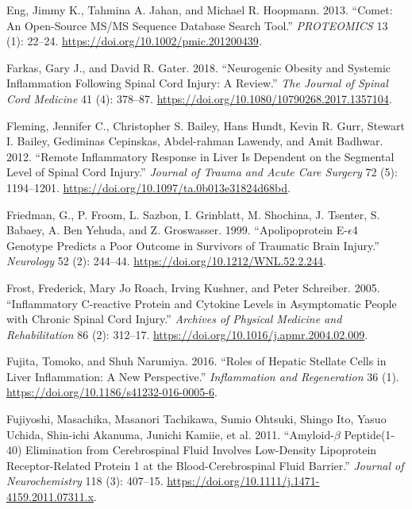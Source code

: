 \documentclass[9pt,lineno]{elife}
\newlength{\cslhangindent}
\newlength{\cslentryspacingunit} %
\newenvironment{CSLReferences}[2] %
 {%
  \setlength{\parindent}{0pt}
  \ifodd #1
  \let\oldpar\par
  \def\par{\hangindent=\cslhangindent\oldpar}
  \fi
  \setlength{\parskip}{#2\cslentryspacingunit}
 }%
 {}
\begin{document}
\begin{landscape}
\begin{landscape}
\begin{landscape}
\begin{landscape}
\begin{CSLReferences}{1}{0}
\leavevmode{}%
Eng, Jimmy K., Tahmina A. Jahan, and Michael R. Hoopmann. 2013. {``Comet: {An} Open-Source {MS}/{MS} Sequence Database Search Tool.''} \emph{PROTEOMICS} 13 (1): 22--24. \url{https://doi.org/10.1002/pmic.201200439}.

\leavevmode{}%
Farkas, Gary J., and David R. Gater. 2018. {``Neurogenic Obesity and Systemic Inflammation Following Spinal Cord Injury: {A} Review.''} \emph{The Journal of Spinal Cord Medicine} 41 (4): 378--87. \url{https://doi.org/10.1080/10790268.2017.1357104}.

\leavevmode{}%
Fleming, Jennifer C., Christopher S. Bailey, Hans Hundt, Kevin R. Gurr, Stewart I. Bailey, Gediminas Cepinskas, Abdel-rahman Lawendy, and Amit Badhwar. 2012. {``Remote Inflammatory Response in Liver Is Dependent on the Segmental Level of Spinal Cord Injury.''} \emph{Journal of Trauma and Acute Care Surgery} 72 (5): 1194--1201. \url{https://doi.org/10.1097/ta.0b013e31824d68bd}.

\leavevmode{}%
Friedman, G., P. Froom, L. Sazbon, I. Grinblatt, M. Shochina, J. Tsenter, S. Babaey, A. Ben Yehuda, and Z. Groswasser. 1999. {``Apolipoprotein {E-\(\epsilon\)4} Genotype Predicts a Poor Outcome in Survivors of Traumatic Brain Injury.''} \emph{Neurology} 52 (2): 244--44. \url{https://doi.org/10.1212/WNL.52.2.244}.

\leavevmode{}%
Frost, Frederick, Mary Jo Roach, Irving Kushner, and Peter Schreiber. 2005. {``Inflammatory {C-reactive} Protein and Cytokine Levels in Asymptomatic People with Chronic Spinal Cord Injury.''} \emph{Archives of Physical Medicine and Rehabilitation} 86 (2): 312--17. \url{https://doi.org/10.1016/j.apmr.2004.02.009}.

\leavevmode{}%
Fujita, Tomoko, and Shuh Narumiya. 2016. {``Roles of Hepatic Stellate Cells in Liver Inflammation: A New Perspective.''} \emph{Inflammation and Regeneration} 36 (1). \url{https://doi.org/10.1186/s41232-016-0005-6}.

\leavevmode{}%
Fujiyoshi, Masachika, Masanori Tachikawa, Sumio Ohtsuki, Shingo Ito, Yasuo Uchida, Shin-ichi Akanuma, Junichi Kamiie, et al. 2011. {``Amyloid-{\(\beta\)} Peptide(1-40) Elimination from Cerebrospinal Fluid Involves Low-Density Lipoprotein Receptor-Related Protein 1 at the Blood-Cerebrospinal Fluid Barrier.''} \emph{Journal of Neurochemistry} 118 (3): 407--15. \url{https://doi.org/10.1111/j.1471-4159.2011.07311.x}.


\end{CSLReferences}
\end{landscape}
\end{landscape}
\end{landscape}
\end{landscape}
\end{document}
